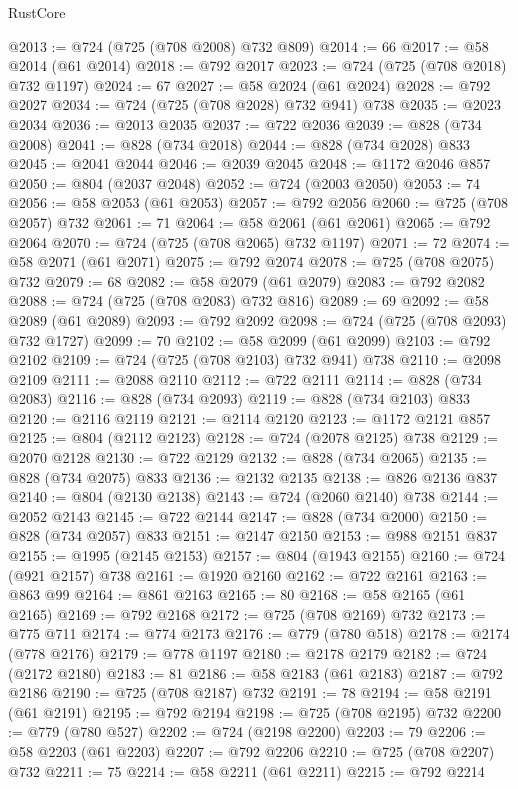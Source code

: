 \begin{lexlean}{RustCore}
\begin{coremodule}
@2013 := @724 (@725 (@708 @2008) @732 @809)
@2014 := 66
@2017 := @58 @2014 (@61 @2014)
@2018 := @792 @2017
@2023 := @724 (@725 (@708 @2018) @732 @1197)
@2024 := 67
@2027 := @58 @2024 (@61 @2024)
@2028 := @792 @2027
@2034 := @724 (@725 (@708 @2028) @732 @941) @738
@2035 := @2023 @2034
@2036 := @2013 @2035
@2037 := @722 @2036
@2039 := @828 (@734 @2008)
@2041 := @828 (@734 @2018)
@2044 := @828 (@734 @2028) @833
@2045 := @2041 @2044
@2046 := @2039 @2045
@2048 := @1172 @2046 @857
@2050 := @804 (@2037 @2048)
@2052 := @724 (@2003 @2050)
@2053 := 74
@2056 := @58 @2053 (@61 @2053)
@2057 := @792 @2056
@2060 := @725 (@708 @2057) @732
@2061 := 71
@2064 := @58 @2061 (@61 @2061)
@2065 := @792 @2064
@2070 := @724 (@725 (@708 @2065) @732 @1197)
@2071 := 72
@2074 := @58 @2071 (@61 @2071)
@2075 := @792 @2074
@2078 := @725 (@708 @2075) @732
@2079 := 68
@2082 := @58 @2079 (@61 @2079)
@2083 := @792 @2082
@2088 := @724 (@725 (@708 @2083) @732 @816)
@2089 := 69
@2092 := @58 @2089 (@61 @2089)
@2093 := @792 @2092
@2098 := @724 (@725 (@708 @2093) @732 @1727)
@2099 := 70
@2102 := @58 @2099 (@61 @2099)
@2103 := @792 @2102
@2109 := @724 (@725 (@708 @2103) @732 @941) @738
@2110 := @2098 @2109
@2111 := @2088 @2110
@2112 := @722 @2111
@2114 := @828 (@734 @2083)
@2116 := @828 (@734 @2093)
@2119 := @828 (@734 @2103) @833
@2120 := @2116 @2119
@2121 := @2114 @2120
@2123 := @1172 @2121 @857
@2125 := @804 (@2112 @2123)
@2128 := @724 (@2078 @2125) @738
@2129 := @2070 @2128
@2130 := @722 @2129
@2132 := @828 (@734 @2065)
@2135 := @828 (@734 @2075) @833
@2136 := @2132 @2135
@2138 := @826 @2136 @837
@2140 := @804 (@2130 @2138)
@2143 := @724 (@2060 @2140) @738
@2144 := @2052 @2143
@2145 := @722 @2144
@2147 := @828 (@734 @2000)
@2150 := @828 (@734 @2057) @833
@2151 := @2147 @2150
@2153 := @988 @2151 @837
@2155 := @1995 (@2145 @2153)
@2157 := @804 (@1943 @2155)
@2160 := @724 (@921 @2157) @738
@2161 := @1920 @2160
@2162 := @722 @2161
@2163 := @863 @99
@2164 := @861 @2163
@2165 := 80
@2168 := @58 @2165 (@61 @2165)
@2169 := @792 @2168
@2172 := @725 (@708 @2169) @732
@2173 := @775 @711
@2174 := @774 @2173
@2176 := @779 (@780 @518)
@2178 := @2174 (@778 @2176)
@2179 := @778 @1197
@2180 := @2178 @2179
@2182 := @724 (@2172 @2180)
@2183 := 81
@2186 := @58 @2183 (@61 @2183)
@2187 := @792 @2186
@2190 := @725 (@708 @2187) @732
@2191 := 78
@2194 := @58 @2191 (@61 @2191)
@2195 := @792 @2194
@2198 := @725 (@708 @2195) @732
@2200 := @779 (@780 @527)
@2202 := @724 (@2198 @2200)
@2203 := 79
@2206 := @58 @2203 (@61 @2203)
@2207 := @792 @2206
@2210 := @725 (@708 @2207) @732
@2211 := 75
@2214 := @58 @2211 (@61 @2211)
@2215 := @792 @2214

\end{coremodule}
\end{lexlean}
